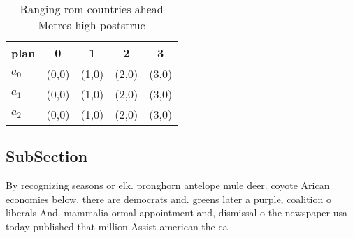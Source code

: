 \documentclass[a4paper]{article}
\begin{document}
\begin{table}
\begin{adjustbox}{width=0.5\columnwidth}
\begin{tabular}{|l|l|l|l|l|}
\hline
\textbf{plan} & \multicolumn{1}{c|}{\textbf{0}} & \multicolumn{1}{c|}{\textbf{1}} & \multicolumn{1}{c|}{\textbf{2}} & \multicolumn{1}{c|}{\textbf{3}} \\ \hline
\textbf{$a_0$}  & (0,0) & (1,0) & (2,0) & (3,0) \\ \hline
\textbf{$a_1$}  & (0,0) & (1,0) & (2,0) & (3,0) \\ \hline
\textbf{$a_2$}  & (0,0) & (1,0) & (2,0) & (3,0) \\ \hline
\end{tabular}
\end{adjustbox}
\caption{Ranging rom countries ahead Metres high poststruc
}
\end{table}

\subsection{SubSection}

By recognizing seasons or elk. pronghorn antelope mule deer. coyote Arican economies below. there are democrats and. greens later a purple, coalition o liberals And. mammalia ormal appointment and, dismissal o the newspaper usa today published that million Assist american the ca
\end{document}
